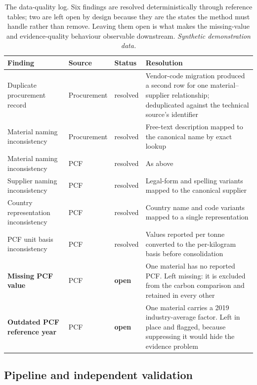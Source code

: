 \documentclass[10pt,twocolumn,a4paper]{article}
\newcommand{\dimhead}[1]{\textbf{#1}}
\newcommand{\synth}{\textit{Synthetic demonstration data.}}
\begin{document}
\begin{table}[t]
  \caption{The data-quality log. Six findings are resolved deterministically
  through reference tables; two are left open by design because they are the
  states the method must handle rather than remove. Leaving them open is what
  makes the missing-value and evidence-quality behaviour observable downstream.
  \synth}
  \label{tab:dq}
  \small
  \begin{tabular}{@{}p{}p{}p{}p{}@{}}
    \toprule
    \dimhead{Finding} & \dimhead{Source} & \dimhead{Status} & \dimhead{Resolution} \\
    \midrule
    Duplicate procurement record & Procurement & resolved & Vendor-code migration produced a second row for one material--supplier relationship; deduplicated against the technical source's identifier \\
    Material naming inconsistency & Procurement & resolved & Free-text description mapped to the canonical name by exact lookup \\
    Material naming inconsistency & PCF & resolved & As above \\
    Supplier naming inconsistency & PCF & resolved & Legal-form and spelling variants mapped to the canonical supplier \\
    Country representation inconsistency & PCF & resolved & Country name and code variants mapped to a single representation \\
    PCF unit basis inconsistency & PCF & resolved & Values reported per tonne converted to the per-kilogram basis before consolidation \\
    \addlinespace[2pt]
    \textcolor{pamber}{\textbf{Missing PCF value}} & PCF & \textcolor{pamber}{\textbf{open}} & One material has no reported PCF. Left missing: it is excluded from the carbon comparison and retained in every other \\
    \textcolor{pamber}{\textbf{Outdated PCF reference year}} & PCF & \textcolor{pamber}{\textbf{open}} & One material carries a 2019 industry-average factor. Left in place and flagged, because suppressing it would hide the evidence problem \\
    \bottomrule
  \end{tabular}
\end{table}

\subsection{Pipeline and independent validation}
\end{document}
